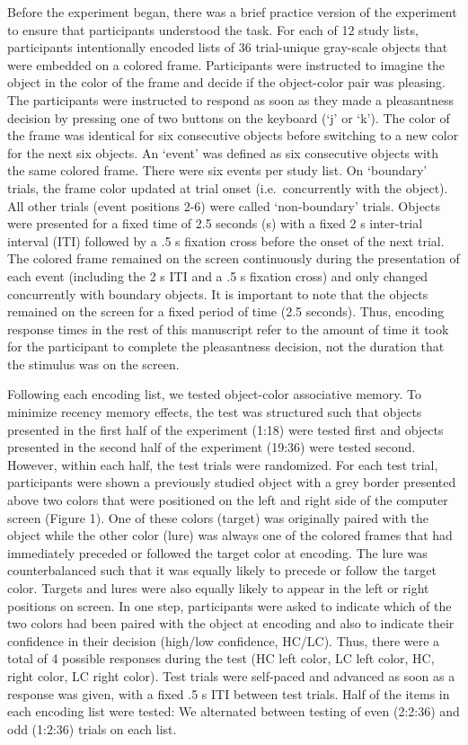 Before the experiment began, there was a brief practice version of the
experiment to ensure that participants understood the task. For each of
12 study lists, participants intentionally encoded lists of 36
trial-unique gray-scale objects that were embedded on a colored frame.
Participants were instructed to imagine the object in the color of the
frame and decide if the object-color pair was pleasing. The participants
were instructed to respond as soon as they made a pleasantness decision
by pressing one of two buttons on the keyboard (`j' or `k'). The color
of the frame was identical for six consecutive objects before switching
to a new color for the next six objects. An `event' was defined as six
consecutive objects with the same colored frame. There were six events
per study list. On `boundary' trials, the frame color updated at trial
onset (i.e.~concurrently with the object). All other trials (event
positions 2-6) were called `non-boundary' trials. Objects were presented
for a fixed time of 2.5 seconds (s) with a fixed 2 s inter-trial
interval (ITI) followed by a .5 s fixation cross before the onset of the
next trial. The colored frame remained on the screen continuously during
the presentation of each event (including the 2 s ITI and a .5 s
fixation cross) and only changed concurrently with boundary objects. It
is important to note that the objects remained on the screen for a fixed
period of time (2.5 seconds). Thus, encoding response times in the rest
of this manuscript refer to the amount of time it took for the
participant to complete the pleasantness decision, not the duration that
the stimulus was on the screen.

Following each encoding list, we tested object-color associative memory.
To minimize recency memory effects, the test was structured such that
objects presented in the first half of the experiment (1:18) were tested
first and objects presented in the second half of the experiment (19:36)
were tested second. However, within each half, the test trials were
randomized. For each test trial, participants were shown a previously
studied object with a grey border presented above two colors that were
positioned on the left and right side of the computer screen (Figure 1).
One of these colors (target) was originally paired with the object while
the other color (lure) was always one of the colored frames that had
immediately preceded or followed the target color at encoding. The lure
was counterbalanced such that it was equally likely to precede or follow
the target color. Targets and lures were also equally likely to appear
in the left or right positions on screen. In one step, participants were
asked to indicate which of the two colors had been paired with the
object at encoding and also to indicate their confidence in their
decision (high/low confidence, HC/LC). Thus, there were a total of 4
possible responses during the test (HC left color, LC left color, HC,
right color, LC right color). Test trials were self-paced and advanced
as soon as a response was given, with a fixed .5 s ITI between test
trials. Half of the items in each encoding list were tested: We
alternated between testing of even (2:2:36) and odd (1:2:36) trials on
each list.

